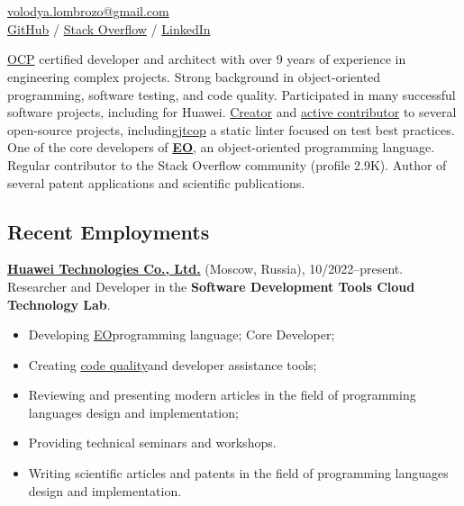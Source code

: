 \documentclass{vl}
\begin{document}
    \vlPrintPhoto{}

    \section*{\Large {}}

    \href{mailto:volodya.lombrozo@gmail.com}{volodya.lombrozo@gmail.com}\\%
    \href{https://github.com/volodya-lombrozo}{GitHub} /
    \href{https://stackoverflow.com/users/10423604/volodya-lombrozo}{Stack Overflow} /
    \href{https://www.linkedin.com/in/vladimir-zakharov-lombrozo-b71744216/}{LinkedIn}

    \vspace*{12pt}

    \href{https://catalog-education.oracle.com/pls/certview/sharebadge?id=87F6A2FE819A5A5AF4120A05900AB28A461EE9A3EE9FBFA02721FADAEB3BCE19}{OCP}
    certified developer and architect with over 9 years of experience in engineering complex projects.
    Strong background in object-oriented programming, software testing, and code quality.
    Participated in many successful software projects, including for Huawei.
    \href{https://github.com/volodya-lombrozo?tab=repositories}{Creator} and
    \href{https://github.com/volodya-lombrozo}{active contributor} to several open-source projects,
    including\href{https://github.com/volodya-lombrozo/jtcop}{jtcop} a static linter focused on test best practices.
    One of the core developers of \textbf{\href{https://www.eolang.org}{EO}}, an object-oriented programming language.
    Regular contributor to the Stack Overflow community (profile 2.9K).
    Author of several patent applications and scientific publications.

    \subsection*{Recent Employments}

    \textbf{\href{https://www.huawei.com}{Huawei Technologies Co., Ltd.}} (Moscow, Russia), 10/2022--present.\newline
    Researcher and Developer in the \textbf{Software Development Tools Cloud Technology Lab}.

    \begin{itemize}
        \item Developing \href{https://github.com/objectionary/eo}{EO}programming language; Core Developer;
        \item
        Creating \href{https://github.com/volodya-lombrozo/jtcop}{code quality}and developer assistance tools;
        \item Reviewing and presenting modern articles in the field of programming languages design and implementation;
        \item Providing technical seminars and workshops.
        \item Writing scientific articles and patents in the field of programming languages design and implementation.
    \end{itemize}
\end{document}
